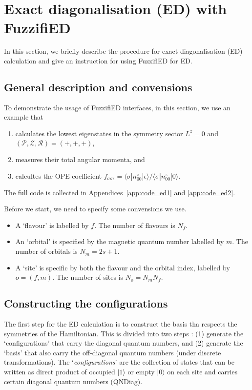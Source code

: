 \documentclass{timesjhep}
\begin{document}
\section{Exact diagonalisation (ED) with FuzzifiED}
\label{sec:ed}

In this section, we briefly describe the procedure for exact diagonalisation (ED) calculation and give an instruction for using FuzzifiED for ED. 

\subsection{General description and convensions}



To demonstrate the usage of FuzzifiED interfaces, in this section, we use an example that 
\begin{enumerate}
    \item calculates the lowest eigenstates in the symmetry sector $L^z=0$ and $(\mathscr{P},\mathscr{Z},\mathscr{R})=(+,+,+)$,
    \item measures their total angular momenta, and 
    \item calcultes the OPE coefficient $f_{\sigma\sigma\epsilon}=\langle \sigma|n^z_{00}|\epsilon\rangle/\langle \sigma|n^z_{00}|0\rangle$.
\end{enumerate}
The full code is collected in Appendices~\ref{app:code_ed1} and \ref{app:code_ed2}.

Before we start, we need to specify some convensions we use.
\begin{itemize}
    \item A `flavour' is labelled by $f$. The number of flavours is $N_f$.
    \item An `orbital' is specified by the magnetic quantum number labelled by $m$. The number of orbitals is $N_m=2s+1$.
    \item A `site' is specific by both the flavour and the orbital index, labelled by $o=(f,m)$. The number of sites is $N_o=N_mN_f$.
\end{itemize}

\subsection{Constructing the configurations}
\label{sec:ed_confs}

The first step for the ED calculation is to construct the basis tha respects the symmetries of the Hamiltonian. This is divided into two steps : (1) generate the `configurations' that carry the diagonal quantum numbers, and (2) generate the `basis' that also carry the off-diagonal quantum numbers (under discrete transformations). The `\textit{configurations}' are the collection of states that can be written as direct product of occupied $|1\rangle$ or empty $|0\rangle$ on each site and carries certain diagonal quantum numbers (QNDiag). 
\end{document}
